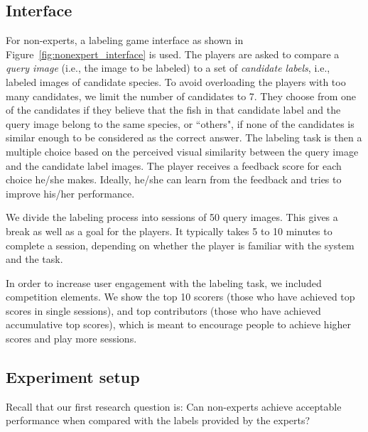 \subsection{Interface}
For non-experts, a labeling game interface as shown in Figure~\ref{fig:nonexpert_interface} is used.
The players are asked to compare a \textit{query image} (i.e., the image to be labeled) to  
a set of \textit{candidate labels}, i.e., labeled images of candidate species.
%
%
To avoid overloading the players with too many candidates, we limit
the number of candidates to 7. 
They choose from one of the candidates if they believe that the fish in that candidate label
and the query image belong to the same species, or ``others",  if none of the candidates is similar enough to 
be considered as the correct answer. The labeling task is then a multiple choice based on 
the perceived visual similarity between the query image and the candidate label images. 
%
The player receives a feedback score for each choice he/she makes. 
Ideally, he/she can learn from the feedback and tries to improve his/her performance. 

We divide the labeling process into sessions of 50 query images. 
This gives a break as well as a goal for the players.  
It typically takes 5 to 10 minutes to complete a session, depending on whether the player is familiar with the 
system and the task.

In order to increase user engagement with the labeling task, we included competition
elements. We show the top 10 scorers (those who have achieved top scores in single sessions),
and top contributors (those who have achieved accumulative top scores), which is meant to encourage
people to achieve higher scores and play more sessions.


\subsection{Experiment setup}
\label{subsec:nonexpt_exp}
Recall that our first research question is: 
Can non-experts achieve acceptable performance when compared 
with the labels provided by the experts?

